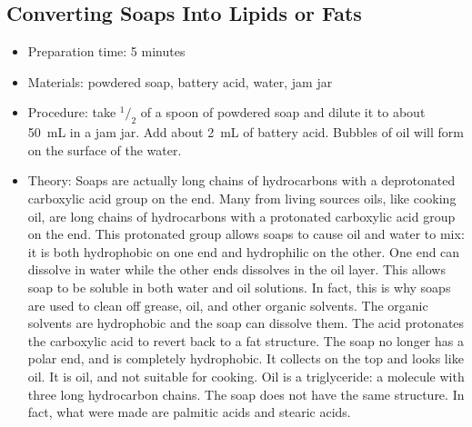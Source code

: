 \subsection{Converting Soaps Into Lipids or Fats}
\begin{itemize}
\item{Preparation time: 5 minutes}
\item{Materials: powdered soap, battery acid, water, jam jar}
\item{Procedure: take $^1/_2$ of a spoon of powdered soap and dilute it to about 50~mL in a jam jar. Add about 2~mL of battery acid. Bubbles of oil will form on the surface of the water.}
\item{Theory: Soaps are actually long chains of hydrocarbons with a deprotonated carboxylic acid group on the end. Many from living sources oils, like cooking oil, are long chains of hydrocarbons with a protonated carboxylic acid group on the end. This protonated group allows soaps to cause oil and water to mix: it is both hydrophobic on one end and hydrophilic on the other. One end can dissolve in water while the other ends dissolves in the oil layer. This allows soap to be soluble in both water and oil solutions. In fact, this is why soaps are used to clean off grease, oil, and other organic solvents. The organic solvents are hydrophobic and the soap can dissolve them. The acid protonates the carboxylic acid to revert back to a fat structure. The soap no longer has a polar end, and is completely hydrophobic. It collects on the top and looks like oil. It is oil, and not suitable for cooking. Oil is a triglyceride: a molecule with three long hydrocarbon chains. The soap does not have the same structure. In fact, what were made are palmitic acids and stearic acids.}
\end{itemize}

